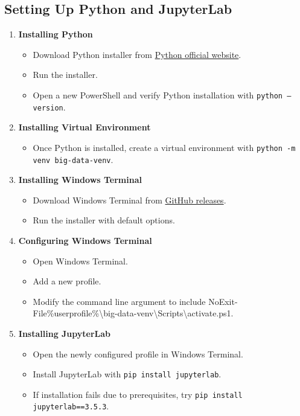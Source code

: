 \documentclass{article}
\begin{document}
\subsection*{Setting Up Python and JupyterLab}
\begin{enumerate}
    \item \textbf{Installing Python}
    \begin{itemize}
    \item Download Python installer from \href{https://www.python.org/downloads/}{Python official website}.
    \item Run the installer.
    \item Open a new PowerShell and verify Python installation with \texttt{python --version}.
\end{itemize}
    
    \item \textbf{Installing Virtual Environment}
    \begin{itemize}
    \item Once Python is installed, create a virtual environment with \texttt{python -m venv big-data-venv}.
\end{itemize}
    
    \item \textbf{Installing Windows Terminal}
\begin{itemize}
    \item Download Windows Terminal from \href{https://github.com/microsoft/terminal/releases}{GitHub releases}.
    \item Run the installer with default options.
\end{itemize}

    \item \textbf{Configuring Windows Terminal}
\begin{itemize}
    \item Open Windows Terminal.
    \item Add a new profile.
    \item Modify the command line argument to include NoExit-File\%userprofile\%\textbackslash big-data-venv\textbackslash Scripts\textbackslash activate.ps1.
\end{itemize}

    \item \textbf{Installing JupyterLab}
\begin{itemize}
    \item Open the newly configured profile in Windows Terminal.
    \item Install JupyterLab with \texttt{pip install jupyterlab}.
    \item If installation fails due to prerequisites, try \texttt{pip install jupyterlab==3.5.3}.
\end{itemize}


\end{enumerate}
\end{document}
